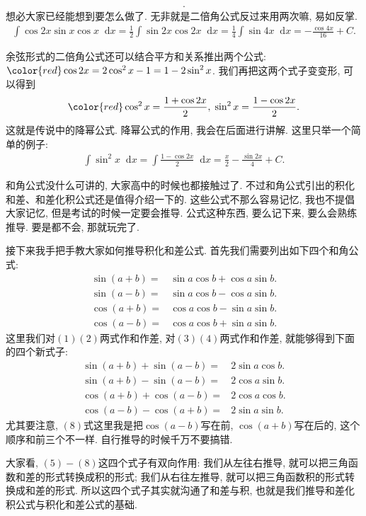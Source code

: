 \documentclass{ctexbook}
\newcommand*{\dif}{\mathop{}\!\mathrm{d}}
\begin{document}
{\begin{align*}
.\end{align*}
想必大家已经能想到要怎么做了. 无非就是二倍角公式反过来用两次嘛, 易如反掌. 
\begin{align*}
\int\cos{2x}\sin{x}\cos{x}\dif{x}=\frac{1}{2}\int\sin{2x}\cos{2x}\dif{x}=\frac{1}{4}\int\sin{4x}\dif{x}=-\frac{\cos{4x}}{16}+C
.\end{align*}\par
余弦形式的二倍角公式还可以结合平方和关系推出两个公式: $\color{red}\cos{2x}=2\cos^{2}{x}-1=1-2\sin^{2}{x}$. 我们再把这两个式子变变形, 可以得到
\begin{align*}\color{red}
\cos^{2}{x}=\frac{1+\cos{2x}}{2},\;\sin^{2}{x}=\frac{1-\cos{2x}}{2}
.\end{align*}
这就是传说中的降幂公式. 降幂公式的作用, 我会在后面进行讲解. 这里只举一个简单的例子: 
\begin{align*}
\int\sin^{2}{x}\dif{x}=\int\frac{1-\cos{2x}}{2}\dif{x}=\frac{x}{2}-\frac{\sin{2x}}{4}+C
.\end{align*}\par
和角公式没什么可讲的, 大家高中的时候也都接触过了. 不过和角公式引出的积化和差、和差化积公式还是值得介绍一下的. 这些公式不那么容易记忆, 我也不提倡大家记忆, 但是考试的时候一定要会推导. 公式这种东西, 要么记下来, 要么会熟练推导. 要是都不会, 那就玩完了. \par
接下来我手把手教大家如何推导积化和差公式. 首先我们需要列出如下四个和角公式: 
\begin{align*}
\sin(a+b)={}&\sin{a}\cos{b}+\cos{a}\sin{b}.\tag{1}\\
\sin(a-b)={}&\sin{a}\cos{b}-\cos{a}\sin{b}.\tag{2}\\
\cos(a+b)={}&\cos{a}\cos{b}-\sin{a}\sin{b}.\tag{3}\\
\cos(a-b)={}&\cos{a}\cos{b}+\sin{a}\sin{b}.\tag{4}
\end{align*}
这里我们对$(1)(2)$两式作和作差, 对$(3)(4)$两式作和作差, 就能够得到下面的四个新式子: 
\begin{align*}
\sin(a+b)+\sin(a-b)={}&2\sin{a}\cos{b}.\tag{5}\\
\sin(a+b)-\sin(a-b)={}&2\cos{a}\sin{b}.\tag{6}\\
\cos(a+b)+\cos(a-b)={}&2\cos{a}\cos{b}.\tag{7}\\
\cos(a-b)-\cos(a+b)={}&2\sin{a}\sin{b}.\tag{8}
\end{align*}
尤其要注意, $(8)$式这里我是把$\cos(a-b)$写在前, $\cos(a+b)$写在后的, 这个顺序和前三个不一样. 自行推导的时候千万不要搞错. \par
大家看, $(5)-(8)$这四个式子有双向作用: 我们从左往右推导, 就可以把三角函数和差的形式转换成积的形式; 我们从右往左推导, 就可以把三角函数积的形式转换成和差的形式. 所以这四个式子其实就沟通了和差与积, 也就是我们推导和差化积公式与积化和差公式的基础. \par
}
\end{document}
